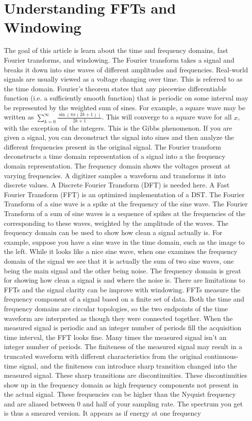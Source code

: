 \documentclass{article}
\theoremstyle{mystyle}
\begin{document}
\section{Understanding FFTs and Windowing}
The goal of this article is learn about the time and frequency domains, fast Fourier transforms, and windowing. The Fourier transform takes a signal and breaks it down into sine waves of different amplitudes and frequencies. Real-world signals are usually viewed as a voltage changing over time. This is referred to as the time domain. Fourier's theorem states that any piecewise differentiable function (i.e. a sufficiently smooth function) that is periodic on some interval may be represented by the weighted sum of sines. For example, a square wave may be written as $\sum_{k=0}^{\infty}\frac{\sin(\pi x(2k+1))}{2k+1}$. This will converge to a square wave for all $x$, with the exception of the integers. This is the Gibbs phenomenon. If you are given a signal, you can deconstruct the signal into sines and then analyze the different frequencies present in the original signal. The Fourier transform deconstructs a time domain representation of a signal into a the frequency domain representation. The frequency domain shows the voltages present at varying frequencies. A digitizer samples a waveform and transforms it into discrete values. A Discrete Fourier Transform (DFT) is needed here. A Fast Fourier Transform (FFT) is an optimized implementation of a DST. The Fourier Transform of a sine wave is a spike at the frequency of the sine wave. The Fourier Transform of a sum of sine waves is a sequence of spikes at the frequencies of the corresponding to these waves, weighted by the amplitude of the waves. The frequency domain can be used to show how clean a signal actually is. For example, suppose you have a sine wave in the time domain, such as the image to the left. While it looks like a nice sine wave, when one examines the frequency domain of the signal we see that it is actually the sum of two sine waves, one being the main signal and the other being noise. The frequency domain is great for showing how clean a signal is and where the noise is. There are limitations to FFTs and the signal clarity can be improve with windowing. FFTs measure the frequency component of a signal based on a finite set of data. Both the time and frequency domains are circular topologies, so the two endpoints of the time waveform are interpreted as though they were connected together. When the measured signal is periodic and an integer number of periods fill the acquisition time interval, the FFT looks fine. Many times the measured signal isn't an integer number of periods. The finiteness of the measured signal may result in a truncated waveform with different characteristics from the original continuous-time signal, and the finiteness can introduce sharp transition changed into the measured signal. These sharp transitions are discontinuities. These discontinuities show up in the frequency domain as high frequency components not present in the actual signal. These frequencies can be higher than the Nyquist frequency and are aliased between $0$ and half of your sampling rate. The spectrum you get is thus a smeared version. It appears as if energy at one frequency 
\end{document}
